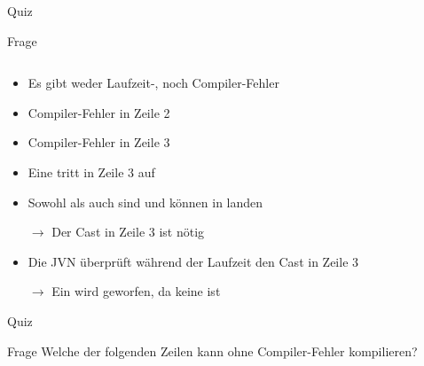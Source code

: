 \documentclass[usepdftitle=false,hyperref={pdfpagelabels=false}]{beamer}
\begin{document}
\begin{frame}{Quiz}
    \begin{block}{Frage}
        \inputminted[linenos=true, numbersep=5pt, tabsize=4, fontsize=\tiny, label=In main, frame=lines]{java}{Generics-quiz-main2.java}
    \end{block}

    \begin{overprint}
    \begin{itemize}
        \item Es gibt weder Laufzeit-, noch Compiler-Fehler
        \item Compiler-Fehler in Zeile 2
        \item Compiler-Fehler in Zeile 3
        \item Eine  tritt in Zeile 3 auf
    \end{itemize}
        \begin{itemize}
            \item Sowohl  als auch  sind
                   und können in 
                  landen
            \item[$\rightarrow$] Der Cast in Zeile 3 ist nötig
            \item Die JVN überprüft während der Laufzeit den Cast in Zeile 3
            \item[$\rightarrow$] Ein  wird geworfen, da  keine  ist
        \end{itemize}
    \end{overprint}
\end{frame}

\begin{frame}{Quiz}
    \begin{block}{Frage}
        Welche der folgenden Zeilen kann ohne Compiler-Fehler kompilieren?
        \inputminted[linenos=true, numbersep=5pt, tabsize=4, fontsize=\tiny]{java}{Question04.java}
    \end{block}

\end{frame}
\end{document}
